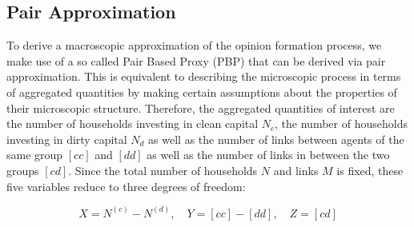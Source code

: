 \subsection{Pair Approximation}

To derive a macroscopic approximation of the opinion formation process, we make use of a so called Pair Based Proxy (PBP) that can be derived via pair approximation. This is equivalent to describing the microscopic process in terms of aggregated quantities by making certain assumptions about the properties of their microscopic structure. Therefore, the aggregated quantities of interest are the number of households investing in clean capital $N_c$, the number of households investing in dirty capital $N_d$ as well as the number of links between agents of the same group $[cc]$ and $[dd]$ as well as the number of links in between the two groups $[cd]$. Since the total number of households $N$ and links $M$ is fixed, these five variables reduce to three degrees of freedom:

\begin{equation}
	X = N^{(c)} - N^{(d)}, \quad Y = [cc] - [dd], \quad Z = [cd]
	\label{eq:opinion_formation_macro_variables}
\end{equation}

